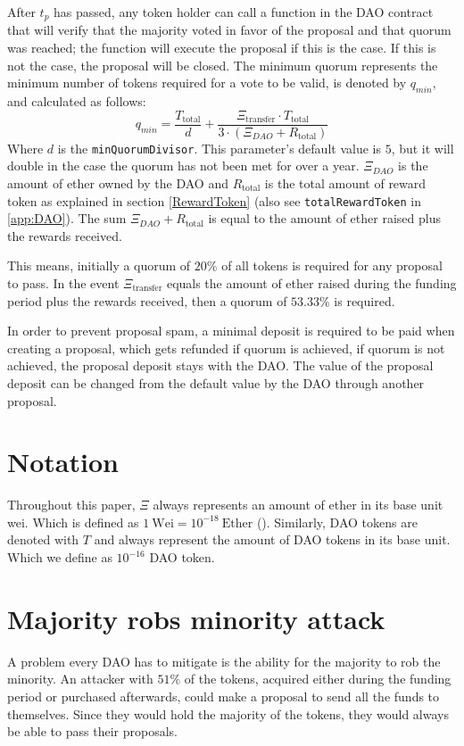 \documentclass[9pt,oneside]{amsart}
\begin{document}
\begin{multicols}{2}
After $t_p$ has passed, any token holder can call a function in the DAO contract that will verify that the majority voted in favor of the proposal and that quorum was reached; the function will execute the proposal if this is the case. If this is not the case, the proposal will be closed. The minimum quorum represents the minimum number of tokens required for a vote to be valid, is denoted by $q_{min}$, and calculated as follows:
\begin{equation}
 q_{min} = \frac{T_{\text{total}}}{d} + \frac{\Xi_{\text{transfer}} \cdot T_{\text{total}}}{3 \cdot (\Xi_{DAO} + R_{\text{total}})}
 \label{minQuorum}
\end{equation}
Where $d$ is the \verb|minQuorumDivisor|. This parameter’s default value is $5$, but it will double in the case the quorum has not been met for over a year.
$\Xi_{DAO}$ is the amount of ether owned by the DAO and $R_{\text{total}}$ is the total amount of reward token as explained in section \ref{RewardToken} (also see \verb|totalRewardToken| in \ref{app:DAO}). The sum $\Xi_{DAO} + R_{\text{total}}$ is equal to the amount of ether raised plus the rewards received.

This means, initially a quorum of  $20\%$ of all tokens is required for any proposal to pass. In the event $\Xi_{\text{transfer}}$ equals the amount of ether raised during the funding period plus the rewards received, then a quorum of $53.33\%$ is required.

In order to prevent proposal spam, a minimal deposit is required to be paid when creating a proposal, which gets refunded if quorum is achieved, if quorum is not achieved, the proposal deposit stays with the DAO. The value of the proposal deposit can be changed from the default value by the DAO through another proposal.

\section{Notation}
Throughout this paper, $\Xi$ always represents an amount of ether in its base unit wei. Which is defined as $1 \: \text{Wei} = 10^{-18} \: \text{Ether}$ (\cite{Wood2014ethereum}).
Similarly, DAO tokens are denoted with $T$ and always represent the amount of DAO tokens in its base unit. Which we define as $10^{-16}$ DAO token.
\section{Majority robs minority attack}
A problem every DAO has to mitigate is the ability for the majority to rob the minority. An attacker with $51\%$ of the tokens, acquired either during the funding period or purchased afterwards, could make a proposal to send all the funds to themselves. Since they would hold the majority of the tokens, they would always be able to pass their proposals.


\end{multicols}
\end{document}
